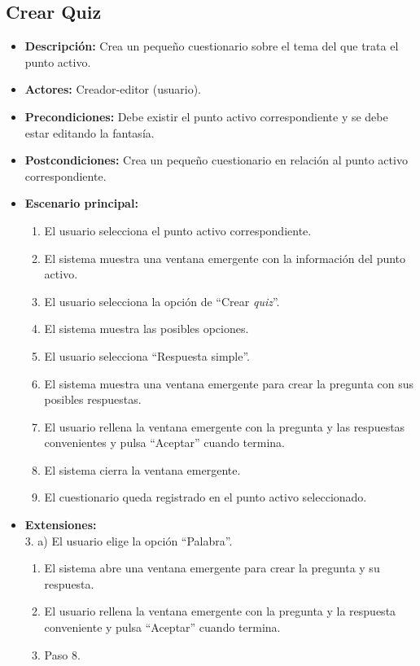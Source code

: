 \documentclass[12pt,letterpaper]{article}
\begin{document}
\subsection{Crear Quiz}
\begin{itemize}
	\item \textbf{Descripción:} Crea un pequeño cuestionario sobre el tema del que trata el punto activo.
	\item \textbf{Actores:} Creador-editor (usuario).
	\item \textbf{Precondiciones:} Debe existir el punto activo correspondiente y se debe estar editando la fantasía.
	\item \textbf{Postcondiciones:} Crea un pequeño cuestionario en relación al punto activo correspondiente.
	\item \textbf{Escenario principal:}
	\begin{enumerate}
		\item El usuario selecciona el punto activo correspondiente.
		\item El sistema muestra una ventana emergente con la información del punto activo.
		\item El usuario selecciona la opción de ``Crear \textit{quiz}''.
		\item El sistema muestra las posibles opciones.
		\item El usuario selecciona ``Respuesta simple''.
		\item El sistema muestra una ventana emergente para crear la pregunta con sus posibles respuestas.
		\item El usuario rellena la ventana emergente con la pregunta y las respuestas convenientes y pulsa ``Aceptar'' cuando termina.
		\item El sistema cierra la ventana emergente.
		\item El cuestionario queda registrado en el punto activo seleccionado.
	\end{enumerate}
	\item \textbf{Extensiones:} \\3. a) El usuario elige la opción ``Palabra''.
	\begin{enumerate}
		\item El sistema abre una ventana emergente para crear la pregunta y su respuesta.
		\item El usuario rellena la ventana emergente con la pregunta y la respuesta conveniente y pulsa ``Aceptar'' cuando termina.
		\item Paso 8.
	\end{enumerate}

\end{itemize}
\end{document}
